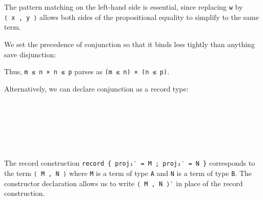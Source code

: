 The pattern matching on the left-hand side is essential, since replacing
\texttt{w} by \texttt{⟨\ x\ ,\ y\ ⟩} allows both sides of the
propositional equality to simplify to the same term.

We set the precedence of conjunction so that it binds less tightly than
anything save disjunction:

\begin{fence}
\begin{code}%
\>[0]\AgdaSpace{}%
\AgdaSpace{}%
\<%
\end{code}
\end{fence}

Thus, \texttt{m\ ≤\ n\ ×\ n\ ≤\ p} parses as
\texttt{(m\ ≤\ n)\ ×\ (n\ ≤\ p)}.

Alternatively, we can declare conjunction as a record type:

\begin{fence}
\begin{code}%
\>[0]\AgdaSpace{}%
\AgdaSpace{}%
\AgdaSymbol{(}\AgdaSpace{}%
\AgdaSpace{}%
\AgdaSymbol{:}\AgdaSpace{}%
\AgdaSymbol{)}\AgdaSpace{}%
\AgdaSymbol{:}\AgdaSpace{}%
\AgdaSpace{}%
\<%
\\
\>[0][@{}l@{\AgdaIndent{0}}]%
\>[2]\AgdaSpace{}%
\<%
\\
%
\>[2]\<%
\\
\>[2][@{}l@{\AgdaIndent{0}}]%
\>[4]\AgdaSpace{}%
\AgdaSymbol{:}\AgdaSpace{}%
\<%
\\
%
\>[4]\AgdaSpace{}%
\AgdaSymbol{:}\AgdaSpace{}%
\<%
\\
\>[0]\AgdaSpace{}%
\<%
\end{code}
\end{fence}

The record construction
\texttt{record\ \{\ proj₁′\ =\ M\ ;\ proj₂′\ =\ N\ \}} corresponds to
the term \texttt{⟨\ M\ ,\ N\ ⟩} where \texttt{M} is a term of type
\texttt{A} and \texttt{N} is a term of type \texttt{B}. The constructor
declaration allows us to write \texttt{⟨\ M\ ,\ N\ ⟩′} in place of the
record construction.

